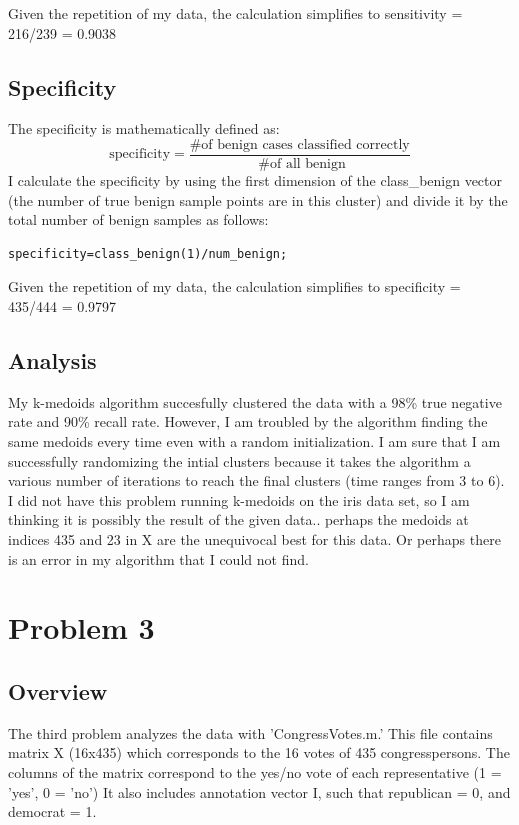 \documentclass{article}
\begin{document}
Given the repetition of my data, the calculation simplifies to sensitivity = 216/239 = 0.9038

\subsection*{Specificity}
The specificity is mathematically defined as:
\[
\text{specificity} = \frac{\text{\# of benign cases classified correctly}}{\text{ \# of all benign}}
\]
I calculate the specificity by using the first dimension of the class\_benign vector (the number of true benign sample points are in this cluster) and divide it by the total number of benign samples as follows:
\begin{verbatim}
specificity=class_benign(1)/num_benign;
\end{verbatim}
Given the repetition of my data, the calculation simplifies to specificity = 435/444 = 0.9797

\subsection*{Analysis}
My k-medoids algorithm succesfully clustered the data with a 98\% true negative rate and 90\% recall rate.  However, I am troubled by the algorithm finding the same medoids every time even with a random initialization.  I am sure that I am successfully randomizing the intial clusters because it takes the algorithm a various number of iterations to reach the final clusters (time ranges from 3 to 6). I did not have this problem running k-medoids on the iris data set, so I am thinking it is possibly the result of the given data.. perhaps the medoids at indices 435 and 23 in X are the unequivocal best for this data.  Or perhaps there is an error in my algorithm that I could not find.


\section*{Problem 3}

\subsection*{Overview}
The third problem analyzes the data with 'CongressVotes.m.'  This file contains matrix X (16x435) which corresponds to the 16 votes of 435 congresspersons. The columns of the matrix correspond to the yes/no vote of each representative (1 = 'yes', 0 = 'no') It also includes annotation vector I, such that republican = 0, and democrat = 1.\\
\end{document}
